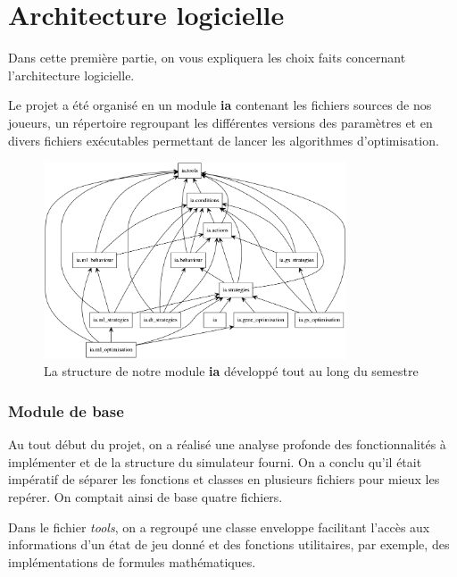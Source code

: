 \documentclass[12pt,a4paper]{article}
\begin{document}
\newpage

\part{Architecture logicielle} %
Dans cette premi\`ere partie, on vous expliquera les choix faits 
concernant l'architecture logicielle.

Le projet a \'et\'e organis\'e en un module {\bfseries ia} 
contenant les fichiers sources de nos joueurs, un r\'epertoire regroupant les 
diff\'erentes versions des param\`etres et en divers fichiers ex\'ecutables 
permettant de lancer les algorithmes d'optimisation.

\begin{figure}[!h]
  \centering
  \captionsetup{justification=centering}
  \includegraphics[width=0.8\textwidth]{packages_IA}
  \caption[La structure du module]{La structure de notre module {\bfseries ia} 
	d\'evelopp\'e tout au long du semestre}
  \label{fig:diag_classes}
\end{figure}

\section{Module de base}
Au tout d\'ebut du projet, on a r\'ealis\'e une analyse profonde des 
fonctionnalit\'es \`a impl\'ementer et de la structure du simulateur fourni. On 
a conclu qu'il \'etait imp\'eratif de s\'eparer les fonctions et classes en 
plusieurs fichiers pour mieux les rep\'erer. On comptait ainsi de base 
quatre fichiers.

Dans le fichier {\itshape tools}, on a regroup\'e une classe enveloppe 
facilitant l'acc\`es aux informations d'un \'etat de jeu donn\'e et des 
fonctions utilitaires, par exemple, des impl\'ementations de formules 
math\'ematiques.
\end{document}
